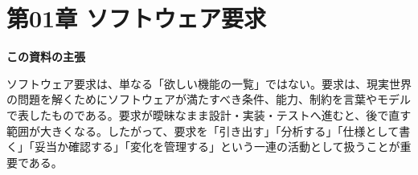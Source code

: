\section{第01章 ソフトウェア要求}
\noindent\textbf{この資料の主張}

ソフトウェア要求は、単なる「欲しい機能の一覧」ではない。要求は、現実世界の問題を解くためにソフトウェアが満たすべき条件、能力、制約を言葉やモデルで表したものである。要求が曖昧なまま設計・実装・テストへ進むと、後で直す範囲が大きくなる。したがって、要求を「引き出す」「分析する」「仕様として書く」「妥当か確認する」「変化を管理する」という一連の活動として扱うことが重要である。

